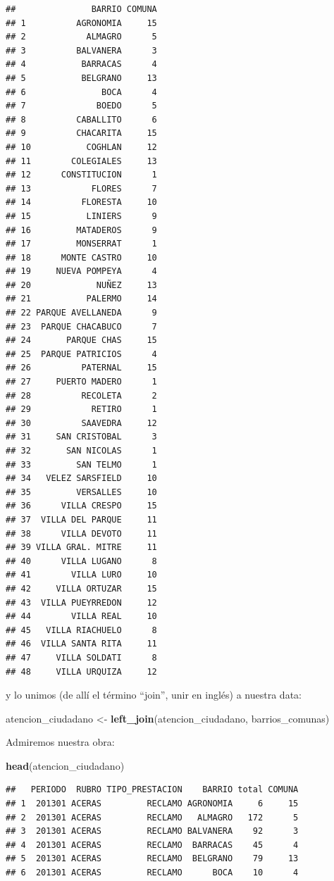 \documentclass[]{book}
\newenvironment{Shaded}{\begin{snugshade}}{\end{snugshade}}
\newcommand{\KeywordTok}[1]{\textcolor[rgb]{0.13,0.29,0.53}{\textbf{#1}}}
\newcommand{\StringTok}[1]{\textcolor[rgb]{0.31,0.60,0.02}{#1}}
\newcommand{\NormalTok}[1]{#1}
\begin{document}
\begin{verbatim}
##               BARRIO COMUNA
## 1          AGRONOMIA     15
## 2            ALMAGRO      5
## 3          BALVANERA      3
## 4           BARRACAS      4
## 5           BELGRANO     13
## 6               BOCA      4
## 7              BOEDO      5
## 8          CABALLITO      6
## 9          CHACARITA     15
## 10           COGHLAN     12
## 11        COLEGIALES     13
## 12      CONSTITUCION      1
## 13            FLORES      7
## 14          FLORESTA     10
## 15           LINIERS      9
## 16         MATADEROS      9
## 17         MONSERRAT      1
## 18      MONTE CASTRO     10
## 19     NUEVA POMPEYA      4
## 20             NUÑEZ     13
## 21           PALERMO     14
## 22 PARQUE AVELLANEDA      9
## 23  PARQUE CHACABUCO      7
## 24       PARQUE CHAS     15
## 25  PARQUE PATRICIOS      4
## 26          PATERNAL     15
## 27     PUERTO MADERO      1
## 28          RECOLETA      2
## 29            RETIRO      1
## 30          SAAVEDRA     12
## 31     SAN CRISTOBAL      3
## 32       SAN NICOLAS      1
## 33         SAN TELMO      1
## 34   VELEZ SARSFIELD     10
## 35         VERSALLES     10
## 36      VILLA CRESPO     15
## 37  VILLA DEL PARQUE     11
## 38      VILLA DEVOTO     11
## 39 VILLA GRAL. MITRE     11
## 40      VILLA LUGANO      8
## 41        VILLA LURO     10
## 42     VILLA ORTUZAR     15
## 43  VILLA PUEYRREDON     12
## 44        VILLA REAL     10
## 45   VILLA RIACHUELO      8
## 46  VILLA SANTA RITA     11
## 47     VILLA SOLDATI      8
## 48     VILLA URQUIZA     12
\end{verbatim}

y lo unimos (de allí el término ``join'', unir en inglés) a nuestra
data:

\begin{Shaded}
\begin{Highlighting}[]
\NormalTok{atencion_ciudadano <-}\StringTok{ }\KeywordTok{left_join}\NormalTok{(atencion_ciudadano, barrios_comunas)}
\end{Highlighting}
\end{Shaded}

Admiremos nuestra obra:

\begin{Shaded}
\begin{Highlighting}[]
\KeywordTok{head}\NormalTok{(atencion_ciudadano)}
\end{Highlighting}
\end{Shaded}

\begin{verbatim}
##   PERIODO  RUBRO TIPO_PRESTACION    BARRIO total COMUNA
## 1  201301 ACERAS         RECLAMO AGRONOMIA     6     15
## 2  201301 ACERAS         RECLAMO   ALMAGRO   172      5
## 3  201301 ACERAS         RECLAMO BALVANERA    92      3
## 4  201301 ACERAS         RECLAMO  BARRACAS    45      4
## 5  201301 ACERAS         RECLAMO  BELGRANO    79     13
## 6  201301 ACERAS         RECLAMO      BOCA    10      4
\end{verbatim}
\end{document}
